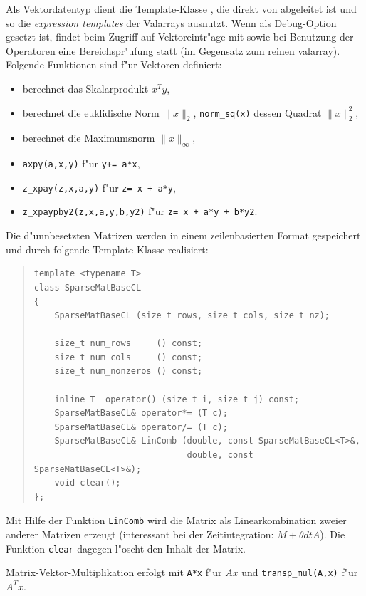 \documentclass[11pt,a4paper]{article}
\newenvironment{Code}{\begin{quote}\scriptsize}{\end{quote}}
\begin{document}
Als Vektordatentyp dient die Template-Klasse , die direkt
von  abgeleitet ist und so die \emph{expression templates}
der Valarrays ausnutzt. Wenn  als Debug-Option gesetzt ist,
findet beim Zugriff auf Vektoreintr"age mit \prg{[]} sowie bei Benutzung der
Operatoren \prg{+, -, =, +=, -=, *=, /=} eine Bereichspr"ufung statt (im Gegensatz zum reinen
valarray). Folgende Funktionen sind f"ur Vektoren definiert:
\begin{itemize}
  \item {} berechnet das Skalarprodukt $x^T y$,
  \item {} berechnet die euklidische Norm $\|x\|_2$, 
    \verb|norm_sq(x)| dessen Quadrat $\|x\|_2^2$,
  \item {} berechnet die Maximumsnorm $\|x\|_\infty$,
  \item \verb|axpy(a,x,y)| f"ur \verb|y+= a*x|,
  \item \verb|z_xpay(z,x,a,y)| f"ur \verb|z= x + a*y|,
  \item \verb|z_xpaypby2(z,x,a,y,b,y2)| f"ur \verb|z= x + a*y + b*y2|.
\end{itemize}

Die d"unnbesetzten Matrizen werden in einem zeilenbasierten Format gespeichert
und durch folgende Template-Klasse realisiert:

\begin{Code}
\begin{verbatim}
template <typename T>
class SparseMatBaseCL
{
    SparseMatBaseCL (size_t rows, size_t cols, size_t nz);

    size_t num_rows     () const;
    size_t num_cols     () const;
    size_t num_nonzeros () const;

    inline T  operator() (size_t i, size_t j) const;
    SparseMatBaseCL& operator*= (T c);
    SparseMatBaseCL& operator/= (T c);
    SparseMatBaseCL& LinComb (double, const SparseMatBaseCL<T>&,
                              double, const SparseMatBaseCL<T>&);
    void clear();
};
\end{verbatim}
\end{Code}
Mit Hilfe der Funktion \verb|LinComb| wird die Matrix als Linearkombination
zweier anderer Matrizen erzeugt (interessant bei der Zeitintegration: $M+\theta
dtA$). Die Funktion \verb|clear| dagegen l"oscht den Inhalt der Matrix.

Matrix-Vektor-Multiplikation erfolgt mit \verb|A*x| f"ur $Ax$ 
und \verb|transp_mul(A,x)| f"ur $A^Tx$.
\end{document}
